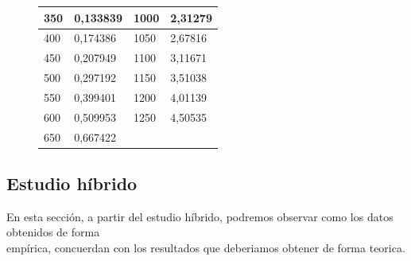 \documentclass[11pt]{article}
\begin{document}
\begin{figure}[H]
\begin{minipage}{0.5\textwidth}
\begin{tabular}{|l|l|l|l|}
        350 & 0,133839 & 1000 & 2,31279 \\ \hline
        400 & 0,174386 & 1050 & 2,67816 \\ \hline
        450 & 0,207949 & 1100 & 3,11671 \\ \hline
        500 & 0,297192 & 1150 & 3,51038 \\ \hline
        550 & 0,399401 & 1200 & 4,01139 \\ \hline
        600 & 0,509953 & 1250 & 4,50535 \\ \hline
        650 & 0,667422 & ~ & \\ \hline
        \end{tabular}
    \end{minipage}
\end{figure}

\subsection{Estudio híbrido}
En esta sección, a partir del estudio híbrido, podremos observar como los datos obtenidos de forma \\
empírica, concuerdan con los resultados que deberiamos obtener de forma teorica.
\end{document}
